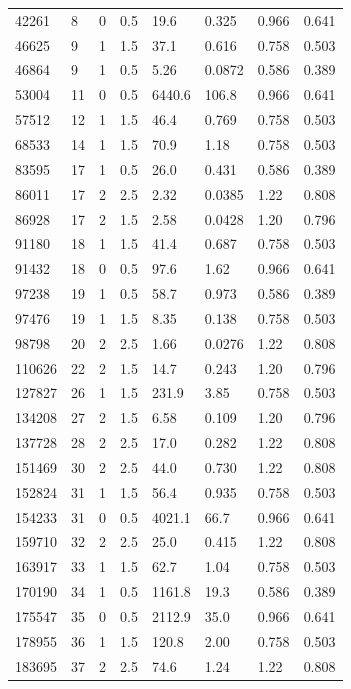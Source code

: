 \documentclass[preview]{standalone}
\begin{document}
{{\begin{tabular}{L{1.2cm}C{1.2cm} C{0.3cm}C{0.5cm} C{1.4cm}C{1.4cm} C{1.4cm}C{1.4cm}}
  42261  &     8  & 0     & 0.5 &  19.6  & 0.325  & 0.966 &  0.641   \\ 
  46625  &     9  & 1     & 1.5 &  37.1  & 0.616  & 0.758 &  0.503   \\ 
  46864  &     9  & 1     & 0.5 &  5.26  & 0.0872  & 0.586 &  0.389   \\ 
  53004  &    11  & 0     & 0.5 &  6440.6  & 106.8  & 0.966 &  0.641   \\ 
  57512  &    12  & 1     & 1.5 &  46.4  & 0.769  & 0.758 &  0.503   \\ 
  68533  &    14  & 1     & 1.5 &  70.9  & 1.18  & 0.758 &  0.503   \\ 
  83595  &    17  & 1     & 0.5 &  26.0  & 0.431  & 0.586 &  0.389   \\ 
  86011  &    17  & 2     & 2.5 &  2.32  & 0.0385  & 1.22 &  0.808   \\ 
  86928  &    17  & 2     & 1.5 &  2.58  & 0.0428  & 1.20 &  0.796   \\ 
  91180  &    18  & 1     & 1.5 &  41.4  & 0.687  & 0.758 &  0.503   \\ 
  91432  &    18  & 0     & 0.5 &  97.6  & 1.62  & 0.966 &  0.641   \\ 
  97238  &    19  & 1     & 0.5 &  58.7  & 0.973  & 0.586 &  0.389   \\ 
  97476  &    19  & 1     & 1.5 &  8.35  & 0.138  & 0.758 &  0.503   \\ 
  98798  &    20  & 2     & 2.5 &  1.66  & 0.0276  & 1.22 &  0.808   \\ 
  110626  &    22  & 2     & 1.5 &  14.7  & 0.243  & 1.20 &  0.796   \\ 
  127827  &    26  & 1     & 1.5 &  231.9  & 3.85  & 0.758 &  0.503   \\ 
  134208  &    27  & 2     & 1.5 &  6.58  & 0.109  & 1.20 &  0.796   \\ 
  137728  &    28  & 2     & 2.5 &  17.0  & 0.282  & 1.22 &  0.808   \\ 
  151469  &    30  & 2     & 2.5 &  44.0  & 0.730  & 1.22 &  0.808   \\ 
  152824  &    31  & 1     & 1.5 &  56.4  & 0.935  & 0.758 &  0.503   \\ 
  154233  &    31  & 0     & 0.5 &  4021.1  & 66.7  & 0.966 &  0.641   \\ 
  159710  &    32  & 2     & 2.5 &  25.0  & 0.415  & 1.22 &  0.808   \\ 
  163917  &    33  & 1     & 1.5 &  62.7  & 1.04  & 0.758 &  0.503   \\ 
  170190  &    34  & 1     & 0.5 &  1161.8  & 19.3  & 0.586 &  0.389   \\ 
  175547  &    35  & 0     & 0.5 &  2112.9  & 35.0  & 0.966 &  0.641   \\ 
  178955  &    36  & 1     & 1.5 &  120.8  & 2.00  & 0.758 &  0.503   \\ 
  183695  &    37  & 2     & 2.5 &  74.6  & 1.24  & 1.22 &  0.808   \\ 
\hline 
\end{tabular} 

}}
\end{document}

